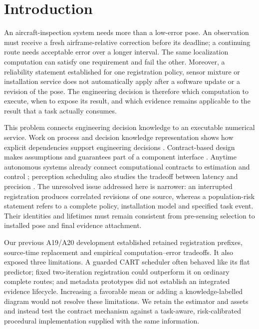 \section{Introduction}\label{sec:introduction}
An aircraft-inspection system needs more than a low-error pose. An observation must receive a fresh airframe-relative correction before its deadline; a continuing route needs acceptable error over a longer interval. The same localization computation can satisfy one requirement and fail the other. Moreover, a reliability statement established for one registration policy, sensor mixture or installation service does not automatically apply after a software update or a revision of the pose. The engineering decision is therefore which computation to execute, when to expose its result, and which evidence remains applicable to the result that a task actually consumes.

This problem connects engineering decision knowledge to an executable numerical service. Work on process and decision knowledge representation shows how explicit dependencies support engineering decisions \cite{wang2021process,hao2021knowledge,su2025manufacturing}. Contract-based design makes assumptions and guarantees part of a component interface \cite{benveniste2018contracts}. Anytime autonomous systems already connect computational contracts to estimation and control \cite{pant2021}; perception scheduling also studies the tradeoff between latency and precision \cite{aldana2023}. The unresolved issue addressed here is narrower: an interrupted registration produces correlated revisions of one source, whereas a population-risk statement refers to a complete policy, installation model and specified task event. Their identities and lifetimes must remain consistent from pre-sensing selection to installed pose and final evidence attachment.

Our previous A19/A20 development established retained registration prefixes, source-time replacement and empirical computation--error tradeoffs. It also exposed three limitations. A guarded CART scheduler often behaved like its flat predictor; fixed two-iteration registration could outperform it on ordinary complete routes; and metadata prototypes did not establish an integrated evidence lifecycle. Increasing a favorable mean or adding a knowledge-labelled diagram would not resolve these limitations. We retain the estimator and assets and instead test the contract mechanism against a task-aware, risk-calibrated procedural implementation supplied with the same information.

